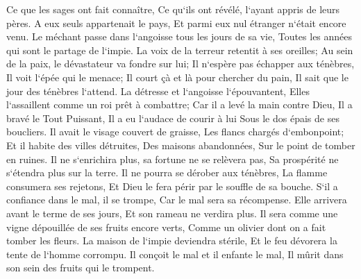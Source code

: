 \verse Ce que les sages ont fait connaître, Ce qu`ils ont révélé, l`ayant appris de leurs pères. 
\verse A eux seuls appartenait le pays, Et parmi eux nul étranger n`était encore venu. 
\verse Le méchant passe dans l`angoisse tous les jours de sa vie, Toutes les années qui sont le partage de l`impie. 
\verse La voix de la terreur retentit à ses oreilles; Au sein de la paix, le dévastateur va fondre sur lui; 
\verse Il n`espère pas échapper aux ténèbres, Il voit l`épée qui le menace; 
\verse Il court çà et là pour chercher du pain, Il sait que le jour des ténèbres l`attend. 
\verse La détresse et l`angoisse l`épouvantent, Elles l`assaillent comme un roi prêt à combattre; 
\verse Car il a levé la main contre Dieu, Il a bravé le Tout Puissant, 
\verse Il a eu l`audace de courir à lui Sous le dos épais de ses boucliers. 
\verse Il avait le visage couvert de graisse, Les flancs chargés d`embonpoint; 
\verse Et il habite des villes détruites, Des maisons abandonnées, Sur le point de tomber en ruines. 
\verse Il ne s`enrichira plus, sa fortune ne se relèvera pas, Sa prospérité ne s`étendra plus sur la terre. 
\verse Il ne pourra se dérober aux ténèbres, La flamme consumera ses rejetons, Et Dieu le fera périr par le souffle de sa bouche. 
\verse S`il a confiance dans le mal, il se trompe, Car le mal sera sa récompense. 
\verse Elle arrivera avant le terme de ses jours, Et son rameau ne verdira plus. 
\verse Il sera comme une vigne dépouillée de ses fruits encore verts, Comme un olivier dont on a fait tomber les fleurs. 
\verse La maison de l`impie deviendra stérile, Et le feu dévorera la tente de l`homme corrompu. 
\verse Il conçoit le mal et il enfante le mal, Il mûrit dans son sein des fruits qui le trompent. 

